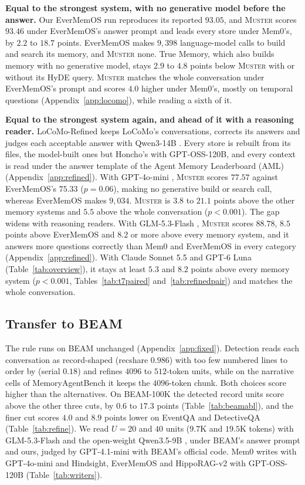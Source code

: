 \documentclass{article}
\newcommand{\sys}{\textsc{Muster}}
\newcommand{\serial}{\textsf{serial}}
\newcommand{\cov}{\textsf{recshare}}
\begin{document}
\textbf{Equal to the strongest system, with no generative model before the answer.} Our EverMemOS run reproduces its reported $93.05$, and \sys{} scores $93.46$ under EverMemOS's answer prompt and leads every store under Mem0's, by $2.2$ to $18.7$ points. EverMemOS makes $9{,}398$ language-model calls to build and search its memory, and \sys{} none. True Memory, which also builds memory with no generative model, stays $2.9$ to $4.8$ points below \sys{} with or without its HyDE query. \sys{} matches the whole conversation under EverMemOS's prompt and scores $4.0$ higher under Mem0's, mostly on temporal questions (Appendix~\ref{app:locomo}), while reading a sixth of it.

\textbf{Equal to the strongest system again, and ahead of it with a reasoning reader.} LoCoMo-Refined \cite{locomorefined} keeps LoCoMo's conversations, corrects its answers and judges each acceptable answer with Qwen3-14B \cite{qwen3}. Every store is rebuilt from its files, the model-built ones but Honcho's with GPT-OSS-120B, and every context is read under the answer template of the Agent Memory Leaderboard (AML) \cite{aml} (Appendix~\ref{app:refined}). With GPT-4o-mini \cite{gpt4omini}, \sys{} scores $77.57$ against EverMemOS's $75.33$ ($p=0.06$), making no generative build or search call, whereas EverMemOS makes $9{,}034$. \sys{} is $3.8$ to $21.1$ points above the other memory systems and $5.5$ above the whole conversation ($p<0.001$). The gap widens with reasoning readers. With GLM-5.3-Flash \cite{glm5}, \sys{} scores $88.78$, $8.5$ points above EverMemOS and $8.2$ or more above every memory system, and it answers more questions correctly than Mem0 and EverMemOS in every category (Appendix~\ref{app:refined}). With Claude Sonnet 5.5 \cite{sonnet55} and GPT-6 Luna \cite{gpt6luna} (Table~\ref{tab:overview}), it stays at least $5.3$ and $8.2$ points above every memory system ($p<0.001$, Tables~\ref{tab:t7paired} and~\ref{tab:refinedpair}) and matches the whole conversation.

\subsection{Transfer to BEAM}\label{sec:beamscale}

The rule runs on BEAM \cite{beam} unchanged (Appendix~\ref{app:fixed}). Detection reads each conversation as record-shaped (\cov{} $0.986$) with too few numbered lines to order by (\serial{} $0.18$) and refines $4096$ to $512$-token units, while on the narrative cells of MemoryAgentBench it keeps the $4096$-token chunk. Both choices score higher than the alternatives. On BEAM-100K the detected record units score above the other three cuts, by $0.6$ to $17.3$ points (Table~\ref{tab:beamabl}), and the finer cut scores $4.0$ and $8.9$ points lower on EventQA and DetectiveQA (Table~\ref{tab:refine}). We read $U=20$ and $40$ units ($9.7$K and $19.5$K tokens) with GLM-5.3-Flash \cite{glm5} and the open-weight Qwen3.5-9B \cite{qwen35}, under BEAM's answer prompt and ours, judged by GPT-4.1-mini with BEAM's official code. Mem0 writes with GPT-4o-mini and Hindsight, EverMemOS and HippoRAG-v2 with GPT-OSS-120B (Table~\ref{tab:writers}).
\end{document}
